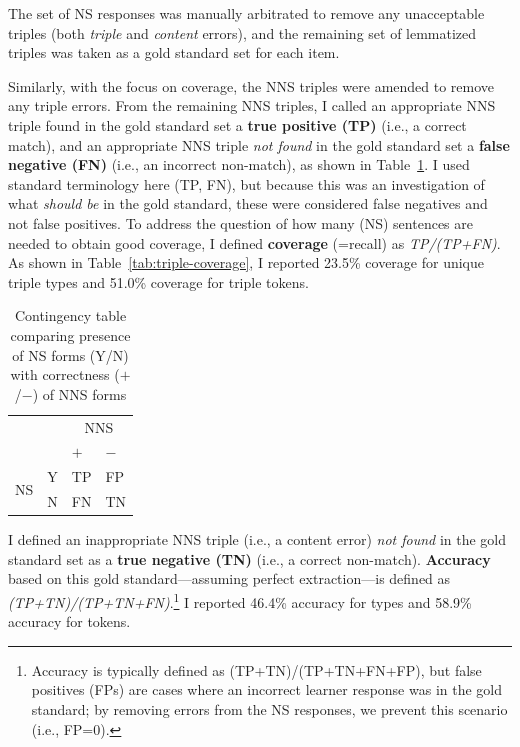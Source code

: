 The set of NS responses was manually arbitrated to remove any
unacceptable triples (both \textit{triple} and \textit{content}
errors), and the remaining set of lemmatized triples was taken as a gold standard
set for each item.

Similarly, with the focus on coverage, the NNS triples were amended to
remove any triple errors.
From the remaining NNS triples, I called an appropriate NNS triple
found in the gold standard set a \textbf{true positive (TP)} (i.e., a
correct match), and an appropriate NNS triple \textit{not found} in
the gold standard set a \textbf{false negative (FN)} (i.e., an
incorrect non-match), as shown in Table~\ref{tab:contingencies}.  I
used standard terminology here (TP, FN), but because this was an investigation of what \emph{should be} in the gold standard, these were considered
false negatives and not false positives.  To address the question of
how many (NS) sentences are needed to obtain good coverage, I defined
\textbf{coverage} (=recall) as \textit{TP/(TP+FN)}. As shown in
Table~\ref{tab:triple-coverage}, I reported 23.5\% coverage for unique triple
types and 51.0\% coverage for triple tokens.

\begin{table}[htb!]
\begin{center}
\begin{tabular}{|ll||l|l|}
  \hline
  & & \multicolumn{2}{c|}{NNS}\\
  & & $+$ & $-$ \\
  \hline
  \hline
  \multirow{2}{*}{NS} & Y & TP & FP \\
  \cline{2-4}
  & N & FN & TN\\
  \hline
\end{tabular}
\end{center}
\caption{Contingency table comparing presence of NS forms (Y/N) with
  correctness ($+$/$-$) of NNS forms}
\label{tab:contingencies}
\end{table}

I defined an inappropriate NNS triple (i.e., a content error)
\textit{not found} in the gold standard set as a \textbf{true negative
  (TN)} (i.e., a correct non-match). \textbf{Accuracy} based on this
gold standard---assuming perfect extraction---is defined as
\textit{(TP+TN)/(TP+TN+FN)}.\footnote{Accuracy is typically defined as
  (TP+TN)/(TP+TN+FN+FP), but false positives (FPs) are cases where an
  incorrect learner response was in the gold standard; by removing errors from the NS responses, we prevent this scenario (i.e., FP=0).} I reported 46.4\% accuracy for types and 58.9\% accuracy for tokens.

